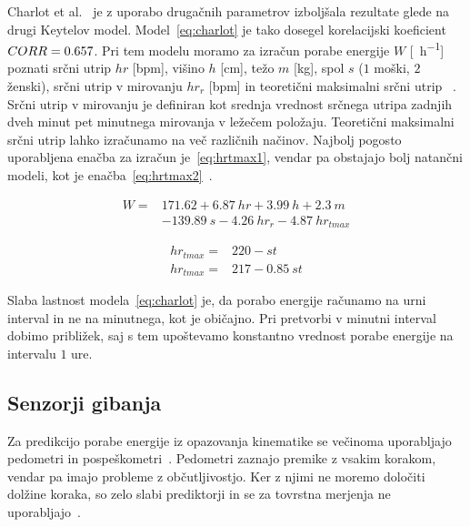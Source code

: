 Charlot et al.~\cite{charlot2014improvement} je z uporabo drugačnih parametrov izboljšala rezultate glede na drugi Keytelov model. Model~\eqref{eq:charlot} je tako dosegel korelacijski koeficient ${CORR}= \num{0.657}$. Pri tem modelu moramo za izračun porabe energije $W$ [\si{\kcal\per\hour}]  poznati srčni utrip $hr$ [\si{bpm}], višino $h$ [\si{\cm}], težo $m$ [\si{\kg}], spol $s$ ($1$ moški, $2$ ženski), srčni utrip v mirovanju $hr_r$ [\si{bpm}] in teoretični maksimalni srčni utrip \hrtmax [\si{bpm}]~\cite{charlot2014improvement}. Srčni utrip v mirovanju je definiran kot srednja vrednost srčnega utripa zadnjih dveh minut pet minutnega mirovanja v ležečem položaju. Teoretični maksimalni srčni utrip lahko izračunamo na več različnih načinov. Najbolj pogosto uporabljena enačba za izračun je~\eqref{eq:hrtmax1}, vendar pa obstajajo bolj natančni modeli, kot je enačba~\eqref{eq:hrtmax2}~\cite{miller1993predicting}. 

\begin{align}\label{eq:charlot}
W = & \num{171.62} + \num{6.87}~hr + \num{3.99}~h + \num{2.3}~m \nonumber \\
& - \num{139.89}~s - \num{4.26}~hr_r - \num{4.87}~hr_{tmax}
\end{align}

\begin{align}
	hr_{tmax} = & \num{220} - st \label{eq:hrtmax1}\\ 
    hr_{tmax} = & 217 - \num{0.85}~st \label{eq:hrtmax2}
\end{align}

Slaba lastnost modela~\eqref{eq:charlot} je, da porabo energije računamo na urni interval in ne na minutnega, kot je običajno. Pri pretvorbi v minutni interval dobimo približek, saj s tem upoštevamo konstantno vrednost porabe energije na intervalu $1$ ure. 





\subsection{Senzorji gibanja}\label{sec:senzorji-gibanja}

Za predikcijo porabe energije iz opazovanja kinematike se večinoma uporabljajo pedometri in pospeškometri~\cite{levine2005measurement}. Pedometri zaznajo premike z vsakim korakom, vendar pa imajo probleme z občutljivostjo. Ker z njimi ne moremo določiti dolžine koraka, so zelo slabi prediktorji in se za tovrstna merjenja ne uporabljajo~\cite{levine2005measurement}.

